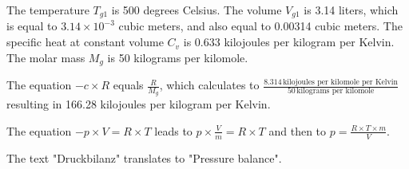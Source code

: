 The temperature \( T_{g1} \) is 500 degrees Celsius. The volume \( V_{g1} \) is 3.14 liters, which is equal to \( 3.14 \times 10^{-3} \) cubic meters, and also equal to 0.00314 cubic meters. The specific heat at constant volume \( C_v \) is 0.633 kilojoules per kilogram per Kelvin. The molar mass \( M_g \) is 50 kilograms per kilomole.

The equation \(-c \times R\) equals \(\frac{R}{M_g}\), which calculates to \(\frac{8.314 \, \text{kilojoules per kilomole per Kelvin}}{50 \, \text{kilograms per kilomole}}\) resulting in 166.28 kilojoules per kilogram per Kelvin.

The equation \(-p \times V = R \times T\) leads to \( p \times \frac{V}{m} = R \times T \) and then to \( p = \frac{R \times T \times m}{V} \).

The text "Druckbilanz" translates to "Pressure balance".